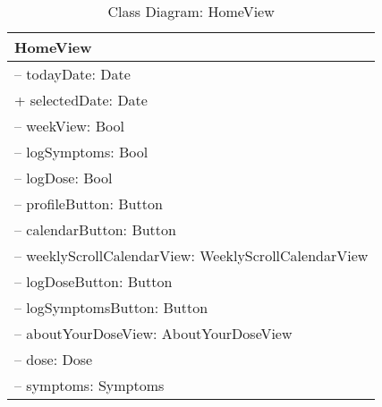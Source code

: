 \begin{table}[H]
\centering
\caption{Class Diagram: HomeView}

\hspace{1em}
\renewcommand{\arraystretch}{1.7}

\begin{tabular}{|l|}
\hline
\textbf{HomeView} \\
\hline
– todayDate: Date \\
+ selectedDate: Date \\
– weekView: Bool \\
– logSymptoms: Bool \\
– logDose: Bool \\
– profileButton: Button \\
– calendarButton: Button \\
– weeklyScrollCalendarView: WeeklyScrollCalendarView \\
– logDoseButton: Button \\
– logSymptomsButton: Button \\
– aboutYourDoseView: AboutYourDoseView \\
– dose: Dose \\
– symptoms: Symptoms \\
\hline
\end{tabular}
\end{table}
